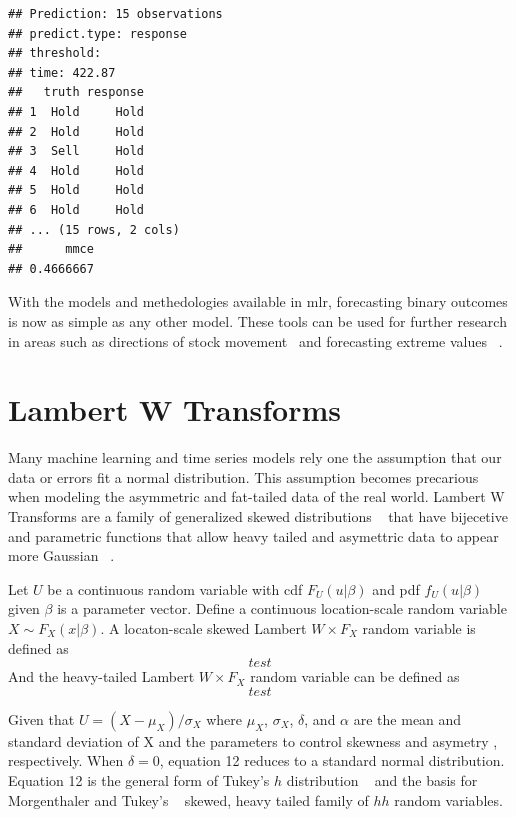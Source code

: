 \documentclass[12pt]{article}\usepackage[]{graphicx}\usepackage[]{color}
\makeatletter
\newenvironment{kframe}{%
 \def\at@end@of@kframe{}%
 \ifinner\ifhmode%
  \def\at@end@of@kframe{\end{minipage}}%
  \begin{minipage}{\columnwidth}%
 \fi\fi%
 \def\FrameCommand##1{\hskip\@totalleftmargin \hskip-\fboxsep
 \colorbox{shadecolor}{##1}\hskip-\fboxsep
     \hskip-\linewidth \hskip-\@totalleftmargin \hskip\columnwidth}%
 \MakeFramed {\advance\hsize-\width
   \@totalleftmargin\z@ \linewidth\hsize
   \@setminipage}}%
 {\par\unskip\endMakeFramed%
 \at@end@of@kframe}
\newenvironment{knitrout}{}{} %
\theoremstyle{definition}
\newcommand{\pkg}[1]{{\fontseries{b}\selectfont #1}}
\makeatother
\begin{document}
\begin{knitrout}
\color{fgcolor}\begin{kframe}
\begin{verbatim}
## Prediction: 15 observations
## predict.type: response
## threshold: 
## time: 422.87
##   truth response
## 1  Hold     Hold
## 2  Hold     Hold
## 3  Sell     Hold
## 4  Hold     Hold
## 5  Hold     Hold
## 6  Hold     Hold
## ... (15 rows, 2 cols)
##      mmce 
## 0.4666667
\end{verbatim}
\end{kframe}
\end{knitrout}
\doublespacing

With the models and methedologies available in \pkg{mlr}, forecasting binary outcomes is now as simple as any other model. These tools can be used for further research in areas such as directions of stock movement~\cite{markClassifStock} and forecasting extreme values ~\cite{Chen2015UsingEV}. 

\section{Lambert W Transforms}

Many machine learning and time series models rely one the assumption that our data or errors fit a normal distribution. This assumption becomes precarious when modeling the asymmetric and fat-tailed data of the real world. Lambert W Transforms are a family of generalized skewed distributions ~\cite{LambertGeneral} that have bijecetive and parametric functions that allow heavy tailed and asymettric data to appear more Gaussian  ~\cite{GaussLam}. 

Let $U$ be a continuous random variable with cdf $F_U(u|\beta)$ and pdf $f_U(u|\beta)$ given $\beta$ is a parameter vector. Define a continuous location-scale random variable $X\sim F_X(x|\beta)$. A locaton-scale skewed Lambert $W\times F_X$ random variable is defined as 
\begin{equation}
test %
\end{equation}
And the heavy-tailed Lambert $W\times F_X$ random variable can be defined as
\begin{equation}
test %
\end{equation}

Given that $U = (X-\mu_X)/\sigma_X$ where $\mu_X$, $\sigma_X$, $\delta$, and $\alpha$ are the mean and standard deviation of X and the parameters to control skewness and asymetry , respectively. When $\delta = 0$, equation 12 reduces to a standard normal distribution. Equation 12 is the general form of Tukey's $h$ distribution ~\cite{ghdist} and the basis for Morgenthaler and Tukey's ~\cite{hhdist} skewed, heavy tailed family of $hh$ random variables.
\end{document}
